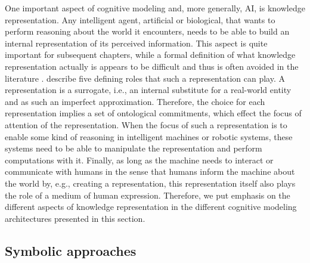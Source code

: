 One important aspect of cognitive modeling and, more generally, \ac{AI}, is knowledge representation.
Any intelligent agent, artificial or biological, that wants to perform reasoning about the world it encounters, needs to be able to build an internal representation of its perceived information.
This aspect is quite important for subsequent chapters, while a formal definition of what knowledge representation actually is appears to be difficult and thus is often avoided in the literature \parencite{Davis1993}.
\textcite{Davis1993} describe five defining roles that such a representation can play.
A representation is a surrogate, i.e., an internal substitute for a real-world entity and as such an imperfect approximation.
Therefore, the choice for each representation implies a set of ontological commitments, which effect the focus of attention of the representation.  
When the focus of such a representation is to enable some kind of reasoning in intelligent machines or robotic systems, these systems need to be able to manipulate the representation and perform computations with it.
Finally, as long as the machine needs to interact or communicate with humans in the sense that humans inform the machine about the world by, e.g., creating a representation, this representation itself also plays the role of a medium of human expression.
Therefore, we put emphasis on the different aspects of knowledge representation in the different cognitive modeling architectures presented in this section.

\subsection{Symbolic approaches}%
\label{subsec:symbolic_approaches}

